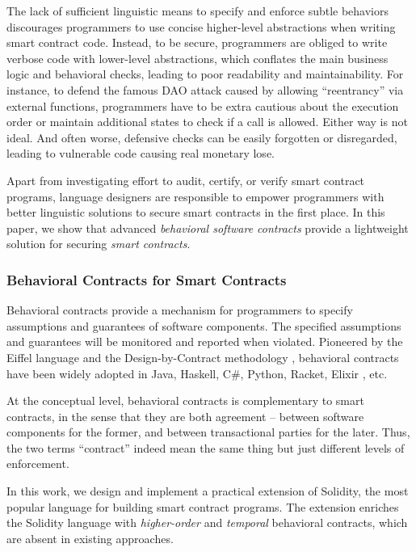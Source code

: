 \documentclass[acmsmall,review,anonymous]{acmart}\settopmatter{printfolios=true,printccs=false,printacmref=false}
\begin{document}
The lack of sufficient linguistic means to specify and enforce subtle behaviors
discourages programmers to use concise higher-level abstractions when writing
smart contract code.
Instead, to be secure, programmers are obliged to write verbose code with
lower-level abstractions, which conflates the main business logic and
behavioral checks, leading to poor readability and maintainability.
For instance, to defend the famous DAO attack  caused by allowing
``reentrancy'' via external functions, programmers have to be extra cautious
about the execution order or maintain additional states to check if a call is
allowed. Either way is not ideal.
And often worse, defensive checks can be easily forgotten or disregarded,
leading to vulnerable code causing real monetary lose.

Apart from investigating effort to audit, certify, or verify smart contract programs,
language designers are responsible to empower programmers with better
linguistic solutions to secure smart contracts in the first place.
In this paper, we show that advanced \emph{behavioral software contracts} provide a
lightweight solution for securing \emph{smart contracts}.

\subsubsection*{\textbf{Behavioral Contracts for Smart Contracts}}
Behavioral contracts provide a mechanism for programmers to specify assumptions
and guarantees of software components. The specified assumptions and guarantees
will be monitored and reported when violated.
Pioneered by the Eiffel language \cite{DBLP:books/ph/Meyer91} and the
Design-by-Contract methodology \cite{DBLP:conf/tools/Meyer98a}, behavioral
contracts have been widely adopted in Java, Haskell, C\#, Python, Racket,
Elixir \cite{DBLP:conf/erlang/0001BBHMEF22}, etc. 


At the conceptual level, behavioral contracts is complementary to smart
contracts, in the sense that they are both agreement -- between software
components for the former, and between transactional parties for the later.
Thus, the two terms ``contract'' indeed mean the same thing but just different
levels of enforcement.

In this work, we design and implement a practical extension of Solidity, the
most popular language for building smart contract programs. The extension
enriches the Solidity language with \emph{higher-order} and \emph{temporal}
behavioral contracts, which are absent in existing approaches.
\end{document}
